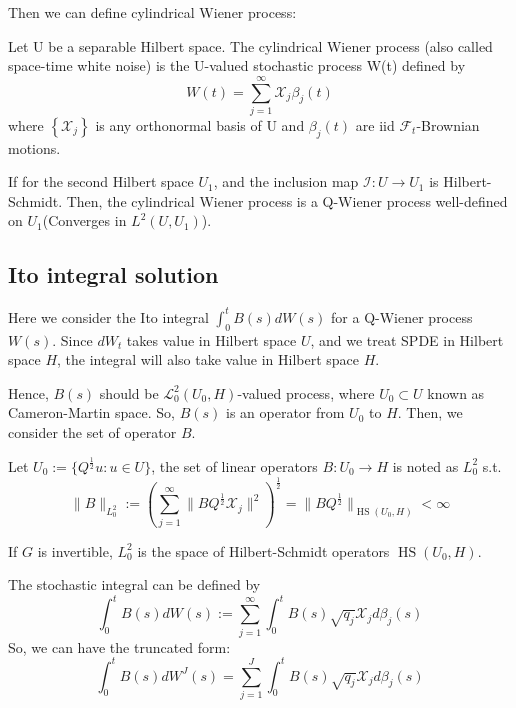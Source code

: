 Then we can define cylindrical Wiener process:  
\begin{definition}
Let  U  be a separable Hilbert space. The cylindrical Wiener process (also called space-time white noise) is the  U-valued stochastic process  W(t)  defined by
$$W(t)=\sum_{j=1}^{\infty} \mathcal{X}_{j} \beta_{j}(t)$$
where  $\left\{\mathcal{X}_{j}\right\}$  is any orthonormal basis of  U  and  $\beta_{j}(t)$  are iid  $\mathcal{F}_{t}$-Brownian motions. 
\end{definition}

\begin{theorem}
    If for the second Hilbert space $U_1$, and the inclusion map $\mathcal{I}: U \rightarrow U_1$ is Hilbert-Schmidt. 
    Then, the cylindrical Wiener process is a Q-Wiener process well-defined on $U_1$(Converges in $L^2(U, U_1)$).
\end{theorem}

\subsection{Ito integral solution}
Here we consider the Ito integral $\int_0^t B(s)dW(s)$ for a Q-Wiener process $W(s)$. 
Since $dW_t$ takes value in Hilbert space $U$, and we treat SPDE in Hilbert space $H$, the integral will also take value in Hilbert space $H$.

Hence, $B(s)$ should be $\mathcal{L}_0^2(U_0, H)$-valued process, where $U_0\subset U$ known as Cameron-Martin space. 
So, $B(s)$ is an operator from $U_0$ to $H$. Then, we consider the set of operator $B$.
\begin{definition}[$L_0^2$ space]
    Let $U_0:=\{Q^{\frac{1}{2}}u: u\in U\}$, the set of linear operators $B:U_0\rightarrow H$ is noted as $L_0^2$ s.t. 
    \begin{equation}
        \|B\|_{L_0^2} := \left(\sum_{j=1}^\infty \|BQ^{\frac{1}{2}}\mathcal{X}_j\|^2\right)^{\frac{1}{2}} = \|BQ^{\frac{1}{2}}\|_{\operatorname{HS}(U_0, H)}<\infty
    \end{equation}
\end{definition}
\begin{remark}
    If $G$ is invertible, $L_0^2$ is the space of Hilbert-Schmidt operators $\operatorname{HS}(U_0, H)$.
\end{remark}

\begin{definition}
    The stochastic integral can be defined by
    \begin{equation}
    \int_0^t B(s)dW(s) := \sum_{j=1}^\infty \int_0^t B(s)\sqrt{q_j}\mathcal{X}_j d\beta_j(s)
\end{equation}
So, we can have the truncated form:
\begin{equation}
    \int_0^t B(s)dW^J(s) = \sum_{j=1}^J \int_0^t B(s)\sqrt{q_j}\mathcal{X}_j d\beta_j(s)
\end{equation}
\end{definition}


